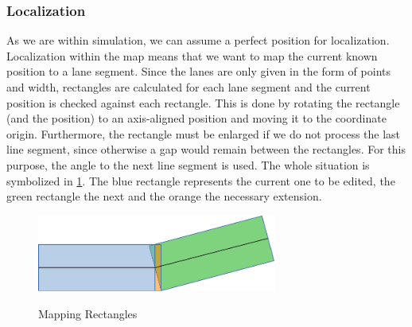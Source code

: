 \documentclass[11pt,oneside,openright]{mpreport}
\begin{document}
\subsubsection{Localization}
As we are within simulation, we can assume a perfect position for localization. Localization within the map means that we want to map 
the current known position to a lane segment. Since the lanes are only given in the form of points and width, rectangles are calculated
for each lane segment and the current position is checked against each rectangle.
This is done by rotating the rectangle (and the position) to an axis-aligned position and moving it to the coordinate origin. Furthermore, the rectangle must be enlarged if we
do not process the last line segment, since otherwise a gap would remain between the rectangles. For this purpose, the angle to the next line segment is used.
The whole situation is symbolized in \cref{mapping}. The blue rectangle represents the current one to be edited, the green rectangle the next and the orange the necessary extension.
\begin{figure}[!ht]
\begin{center}
\caption{Mapping Rectangles}
\includegraphics[width=0.7\textwidth]{bilder/mapping.pdf}
\label{mapping}
\end{center}
\end{figure}
\end{document}
